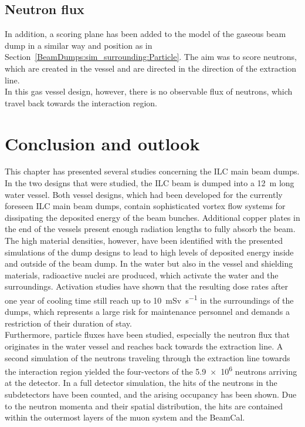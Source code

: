 \subsection{Neutron flux}
In addition, a scoring plane has been added to the \fluka model of the gaseous beam dump in a similar way and position as in Section~\ref{BeamDumps:sim_surrounding:Particle}.
The aim was to score neutrons, which are created in the vessel and are directed in the direction of the extraction line.
\\In this gas vessel design, however, there is no observable flux of neutrons, which travel back towards the interaction region.

\section{Conclusion and outlook}
This chapter has presented several studies concerning the ILC main beam dumps.
In the two designs that were studied, the ILC beam is dumped into a \SI{12}{\meter} long water vessel.
Both vessel designs, which had been developed for the currently foreseen ILC main beam dumps, contain sophisticated vortex flow systems for dissipating the deposited energy of the beam bunches.
Additional copper plates in the end of the vessels present enough radiation lengths to fully absorb the beam.
The high material densities, however, have been identified with the presented \fluka simulations of the dump designs to lead to high levels of deposited energy inside and outside of the beam dump.
In the water but also in the vessel and shielding materials, radioactive nuclei are produced, which activate the water and the surroundings.
Activation studies have shown that the resulting dose rates after one year of cooling time still reach up to \SI{10}{\milli\sievert\per\second} in the surroundings of the dumps, which represents a large risk for maintenance personnel and demands a restriction of their duration of stay.
\\Furthermore, particle fluxes have been studied, especially the neutron flux that originates in the water vessel and reaches back towards the extraction line.
A second \fluka simulation of the neutrons traveling through the extraction line towards the interaction region yielded the four-vectors of the \num{5.9e6} neutrons arriving at the \sid detector.
In a full \geant detector simulation, the hits of the neutrons in the \sid subdetectors have been 
counted, and the arising occupancy has been shown.
Due to the neutron momenta and their spatial distribution, the hits are contained within the outermost layers of the \sid muon system and the BeamCal.

